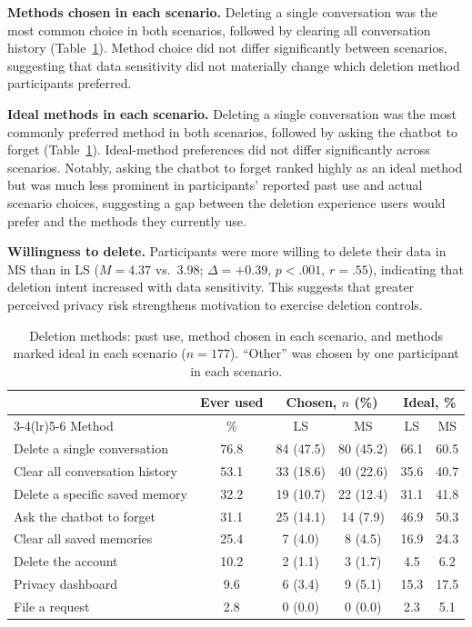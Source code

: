 \documentclass[conference,compsoc]{IEEEtran}
\begin{document}
\textbf{Methods chosen in each scenario.} Deleting a single conversation was the most common choice in both scenarios, followed by clearing all conversation history (Table~\ref{tab:method-usage}). Method choice did not differ significantly between scenarios, suggesting that data sensitivity did not materially change which deletion method participants preferred.

\textbf{Ideal methods in each scenario.} Deleting a single conversation was the most commonly preferred method in both scenarios, followed by asking the chatbot to forget (Table~\ref{tab:method-usage}). Ideal-method preferences did not differ significantly across scenarios. Notably, asking the chatbot to forget ranked highly as an ideal method but was much less prominent in participants' reported past use and actual scenario choices, suggesting a gap between the deletion experience users would prefer and the methods they currently use.

\textbf{Willingness to delete.} Participants were more willing to delete their data in MS than in LS ($M=4.37$ vs.\ $3.98$; $\Delta=+0.39$, $p<.001$, $r=.55$), indicating that deletion intent increased with data sensitivity. This suggests that greater perceived privacy risk strengthens motivation to exercise deletion controls.

\begin{table}[t]
\centering
\caption{Deletion methods: past use, method chosen in each scenario, and methods marked ideal in each scenario ($n=177$). ``Other'' was chosen by one participant in each scenario.}
\label{tab:method-usage}
\small
\begin{tabular}{lccccc}
\toprule
 & Ever used & \multicolumn{2}{c}{Chosen, $n$ (\%)} & \multicolumn{2}{c}{Ideal, \%} \\
\cmidrule(lr){3-4}\cmidrule(lr){5-6}
Method & \% & LS & MS & LS & MS \\
\midrule
Delete a single conversation & 76.8 & 84 (47.5) & 80 (45.2) & 66.1 & 60.5 \\
Clear all conversation history & 53.1 & 33 (18.6) & 40 (22.6) & 35.6 & 40.7 \\
Delete a specific saved memory & 32.2 & 19 (10.7) & 22 (12.4) & 31.1 & 41.8 \\
Ask the chatbot to forget & 31.1 & 25 (14.1) & 14 (7.9) & 46.9 & 50.3 \\
Clear all saved memories & 25.4 & 7 (4.0) & 8 (4.5) & 16.9 & 24.3 \\
Delete the account & 10.2 & 2 (1.1) & 3 (1.7) & 4.5 & 6.2 \\
Privacy dashboard & 9.6 & 6 (3.4) & 9 (5.1) & 15.3 & 17.5 \\
File a request & 2.8 & 0 (0.0) & 0 (0.0) & 2.3 & 5.1 \\
\bottomrule
\end{tabular}
\end{table}
\end{document}

